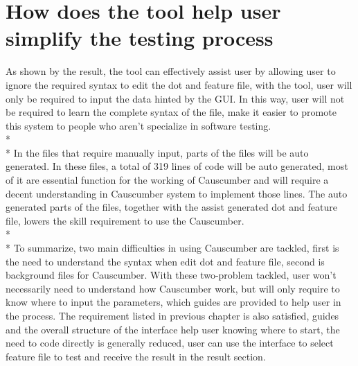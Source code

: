 \section{How does the tool help user simplify the testing process}
As shown by the result, the tool can effectively assist user by allowing user to ignore the required syntax to edit the dot and feature file, with the tool, user will only be required to input the data hinted by the GUI. In this way, user will not be required to learn the complete syntax of the file, make it easier to promote this system to people who aren’t specialize in software testing.\\*\\*
In the files that require manually input, parts of the files will be auto generated. In these files, a total of 319 lines of code will be auto generated, most of it are essential function for the working of Causcumber and will require a decent understanding in Causcumber system to implement those lines. The auto generated parts of the files, together with the assist generated dot and feature file, lowers the skill requirement to use the Causcumber.\\*\\*
To summarize, two main difficulties in using Causcumber are tackled, first is the need to understand the syntax when edit dot and feature file, second is background files for Causcumber. With these two-problem tackled, user won’t necessarily need to understand how Causcumber work, but will only require to know where to input the parameters, which guides are provided to help user in the process. The requirement listed in previous chapter is also satisfied, guides and the overall structure of the interface help user knowing where to start, the need to code directly is generally reduced, user can use the interface to select feature file to test and receive the result in the result section.





